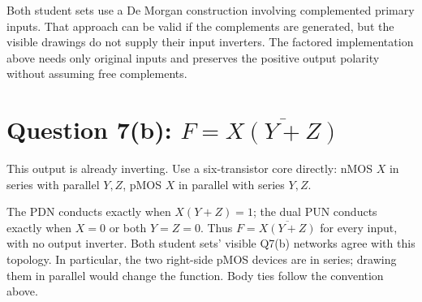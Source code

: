 \documentclass[10pt]{article}
\newcommand{\mos}[4]{\begin{scope}[shift={(#1,#2)}]
\draw(0,.24)--(0,-.24);\draw(0,.2)--(.25,.2)--(.25,.5);\draw(0,-.2)--(.25,-.2)--(.25,-.5);
\draw(-.16,.23)--(-.16,-.23);
\ifnum#4=1\draw(-.26,0)circle(.06);\draw(-.75,0)--(-.32,0);\else\draw(-.75,0)--(-.16,0);\fi
\node[anchor=east,font=\scriptsize]at(-.76,0){$#3$};\end{scope}}
\newcommand{\gnd}[2]{\draw(#1,#2)--(#1,{#2-.12});\draw({#1-.17},{#2-.12})--({#1+.17},{#2-.12});\draw({#1-.11},{#2-.2})--({#1+.11},{#2-.2});}
\newcommand{\rail}[3]{\draw(#1,#2)--(#1,{#2+.14});\node[above,font=\scriptsize]at(#1,{#2+.14}){$#3$};}
\begin{document}
Both student sets use a De Morgan construction involving complemented primary inputs. That approach can be valid if the complements are generated, but the visible drawings do not supply their input inverters. The factored implementation above needs only original inputs and preserves the positive output polarity without assuming free complements.

\newpage\section*{Question 7(b): $F=\overline{X(Y+Z)}$}
This output is already inverting. Use a six-transistor core directly: nMOS $X$ in series with parallel $Y,Z$, pMOS $X$ in parallel with series $Y,Z$.
\begin{center}\end{center}
The PDN conducts exactly when $X(Y+Z)=1$; the dual PUN conducts exactly when $X=0$ or both $Y=Z=0$. Thus $F=\overline{X(Y+Z)}$ for every input, with no output inverter. Both student sets' visible Q7(b) networks agree with this topology. In particular, the two right-side pMOS devices are in series; drawing them in parallel would change the function. Body ties follow the convention above.
\end{document}
